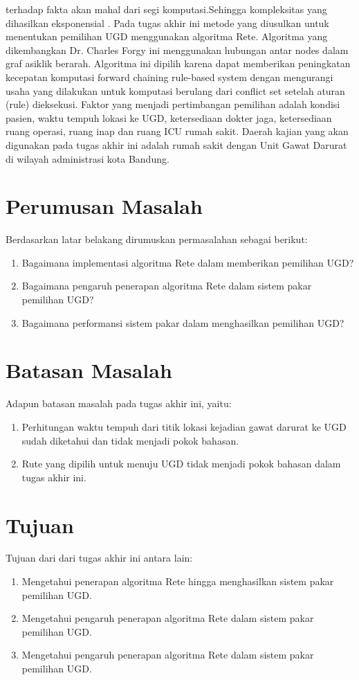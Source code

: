 terhadap fakta akan mahal dari segi komputasi.Sehingga kompleksitas yang dihasilkan eksponensial \cite{freeman}.
Pada tugas akhir ini metode yang diusulkan untuk menentukan pemilihan UGD menggunakan algoritma Rete. Algoritma yang dikembangkan Dr. Charles Forgy \cite{charles1982} ini menggunakan hubungan antar nodes dalam graf asiklik berarah. Algoritma ini dipilih karena dapat memberikan peningkatan kecepatan komputasi forward chaining rule-based system dengan mengurangi usaha yang dilakukan untuk komputasi berulang dari conflict set setelah aturan (rule) dieksekusi. Faktor yang menjadi pertimbangan pemilihan adalah kondisi pasien, waktu tempuh lokasi ke UGD, ketersediaan dokter jaga, ketersediaan ruang operasi, ruang inap dan ruang ICU rumah sakit. Daerah kajian yang akan digunakan pada tugas akhir ini adalah rumah sakit dengan Unit Gawat Darurat di wilayah administrasi kota Bandung.
\section{Perumusan Masalah}
Berdasarkan latar belakang dirumuskan permasalahan sebagai berikut:
\begin{enumerate}
    \item Bagaimana implementasi algoritma Rete dalam memberikan pemilihan UGD?
    \item Bagaimana pengaruh penerapan algoritma Rete dalam sistem pakar pemilihan UGD?
    \item Bagaimana performansi sistem pakar dalam menghasilkan pemilihan UGD?
\end{enumerate}
\section{Batasan Masalah}
Adapun batasan masalah pada tugas akhir ini, yaitu:
\begin{enumerate}
	\item Perhitungan waktu tempuh dari titik lokasi kejadian gawat darurat ke UGD sudah diketahui dan tidak menjadi pokok bahasan.
	\item Rute yang dipilih untuk menuju UGD tidak menjadi pokok bahasan dalam tugas akhir ini.
\end{enumerate}
\section{Tujuan}
Tujuan dari dari tugas akhir ini antara lain:
\begin{enumerate}
    \item Mengetahui penerapan algoritma Rete hingga menghasilkan sistem pakar pemilihan UGD.
    \item Mengetahui pengaruh penerapan algoritma Rete dalam sistem pakar pemilihan UGD.
    \item Mengetahui pengaruh penerapan algoritma Rete dalam sistem pakar pemilihan UGD.
\end{enumerate}
